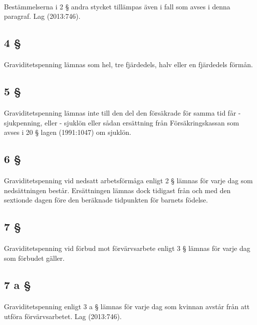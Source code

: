 \documentclass[a4paper,notitlepage,openany,10pt]{book}
\begin{document}
\paragraph*{}
Bestämmelserna i 2 § andra stycket tillämpas även i fall som avses i denna paragraf.
Lag (2013:746).
\subsection*{4 §}
\paragraph*{}
Graviditetspenning lämnas som hel, tre fjärdedels, halv eller en fjärdedels förmån.
\subsection*{5 §}
\paragraph*{}
Graviditetspenning lämnas inte till den del den försäkrade för samma tid får
\newline - sjukpenning, eller
\newline - sjuklön eller sådan ersättning från Försäkringskassan som avses i 20 § lagen (1991:1047) om sjuklön.
\subsection*{6 §}
\paragraph*{}
Graviditetspenning vid nedsatt arbetsförmåga enligt 2 § lämnas för varje dag som nedsättningen består. Ersättningen lämnas dock tidigast från och med den sextionde dagen före den beräknade tidpunkten för barnets födelse.
\subsection*{7 §}
\paragraph*{}
Graviditetspenning vid förbud mot förvärvsarbete enligt 3 § lämnas för varje dag som förbudet gäller.
\subsection*{7 a §}
\paragraph*{}
Graviditetspenning enligt 3 a § lämnas för varje dag som kvinnan avstår från att utföra förvärvsarbetet.
Lag (2013:746).
\end{document}

